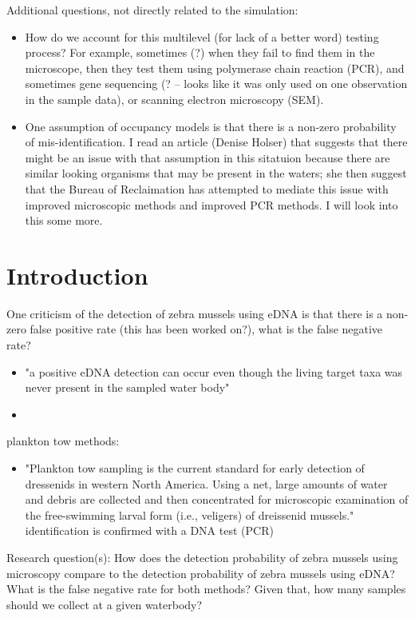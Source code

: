 \documentclass[12pt]{article}\usepackage[]{graphicx}\usepackage[]{color}
\begin{document}
Additional questions, not directly related to the simulation:
\begin{itemize}
	\item How do we account for this multilevel (for lack of a better word) testing process? For example, sometimes (?) when they fail to find them in the microscope, then they test them using polymerase chain reaction (PCR), and sometimes gene sequencing (? -- looks like it was only used on one observation in the sample data), or scanning electron microscopy (SEM).
	\item One assumption of occupancy models is that there is a non-zero probability of mis-identification. I read an article (Denise Holser) that suggests that there might be an issue with that assumption in this sitatuion because there are similar looking organisms that may be present in the waters; she then suggest that the Bureau of Reclaimation has attempted to mediate this issue with improved microscopic methods and improved PCR methods. I will look into this some more.   
\end{itemize}


\section{Introduction}



One criticism of the detection of zebra mussels using eDNA is that there is a non-zero false positive rate (this has been worked on?), what is the false negative rate?
\begin{itemize}
\item "a positive eDNA detection can occur even though the living target taxa was never present in the sampled water body" \cite{Sepulveda:eDNA}
\item 
\end{itemize}

plankton tow methods: 
\begin{itemize}
\item "Plankton tow sampling is the current standard for early detection of dressenids in western North America. Using a net, large amounts of water and debris are collected and then concentrated for microscopic examination of the free-swimming larval form (i.e., veligers) of dreissenid mussels." identification is confirmed with a DNA test (PCR) \cite{Sepulvelda:eDNA} 
\end{itemize}

Research question(s): How does the detection probability of zebra mussels using microscopy compare to the detection probability of zebra mussels using eDNA? What is the false negative rate for both methods? Given that, how many samples should we collect at a given waterbody? 
\end{document}

